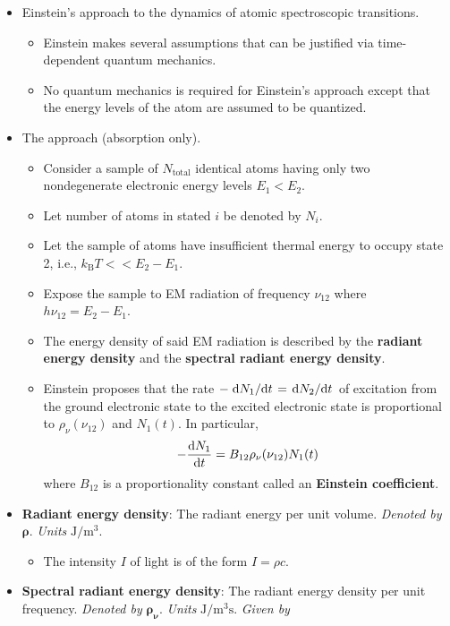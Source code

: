 \documentclass[../notes.tex]{subfiles}
\begin{document}
\begin{itemize}
    \item Einstein's approach to the dynamics of atomic spectroscopic transitions.
    \begin{itemize}
        \item Einstein makes several assumptions that can be justified via time-dependent quantum mechanics.
        \item No quantum mechanics is required for Einstein's approach except that the energy levels of the atom are assumed to be quantized.
    \end{itemize}
    \item The approach (absorption only).
    \begin{itemize}
        \item Consider a sample of $N_\text{total}$ identical atoms having only two nondegenerate electronic energy levels $E_1<E_2$.
        \item Let number of atoms in stated $i$ be denoted by $N_i$.
        \item Let the sample of atoms have insufficient thermal energy to occupy state 2, i.e., $k_\text{B}T<<E_2-E_1$.
        \item Expose the sample to EM radiation of frequency $\nu_{12}$ where $h\nu_{12}=E_2-E_1$.
        \item The energy density of said EM radiation is described by the \textbf{radiant energy density} and the \textbf{spectral radiant energy density}.
        \item Einstein proposes that the rate $-\dv*{N_1}{t}=\dv*{N_2}{t}$ of excitation from the ground electronic state to the excited electronic state is proportional to $\rho_\nu(\nu_{12})$ and $N_1(t)$. In particular,
        \begin{equation*}
            -\dv{N_1}{t} = B_{12}\rho_\nu(\nu_{12})N_1(t)
        \end{equation*}
        where $B_{12}$ is a proportionality constant called an \textbf{Einstein coefficient}.
    \end{itemize}
    \item \textbf{Radiant energy density}: The radiant energy per unit volume. \emph{Denoted by} $\bm{\rho}$. \emph{Units} $\si{\joule\per\cubic\meter}$.
    \begin{itemize}
        \item The intensity $I$ of light is of the form $I=\rho c$.
    \end{itemize}
    \item \textbf{Spectral radiant energy density}: The radiant energy density per unit frequency. \emph{Denoted by} $\bm{\rho_\nu}$. \emph{Units} $\si{\joule\per\cubic\meter\second}$. \emph{Given by}

\end{itemize}
\end{document}
